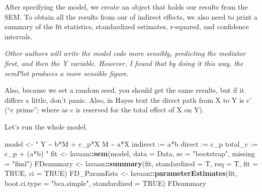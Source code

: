 \documentclass[
  11pt,
]{book}
\newenvironment{Shaded}{\begin{snugshade}}{\end{snugshade}}
\newcommand{\AttributeTok}[1]{\textcolor[rgb]{0.27,0.27,0.27}{#1}}
\newcommand{\ConstantTok}[1]{\textcolor[rgb]{0.37,0.37,0.37}{#1}}
\newcommand{\FunctionTok}[1]{\textcolor[rgb]{0.27,0.27,0.27}{\textbf{#1}}}
\newcommand{\NormalTok}[1]{#1}
\newcommand{\OtherTok}[1]{\textcolor[rgb]{0.37,0.37,0.37}{#1}}
\newcommand{\SpecialCharTok}[1]{\textcolor[rgb]{0.43,0.43,0.43}{\textbf{#1}}}
\newcommand{\StringTok}[1]{\textcolor[rgb]{0.5,0.5,0.5}{#1}}
\begin{document}
After specifying the model, we create an object that holds our results from the SEM. To obtain all the results from our of indirect effects, we also need to print a summary of the fit statistics, standardized estimates, r-squared, and confidence intervals.

\emph{Other authors will write the model code more sensibly, predicting the mediator first, and then the Y variable. However, I found that by doing it this way, the semPlot produces a more sensible figure.}

Also, because we set a random seed, you should get the same results, but if it differs a little, don't panic. Also, in Hayes text the direct path from X to Y is c' (``c prime''; where as c is reserved for the total effect of X on Y).

Let's run the whole model.

\begin{Shaded}
\begin{Highlighting}[]
\NormalTok{model }\OtherTok{\textless{}{-}} \StringTok{"}
\StringTok{          Y \textasciitilde{} b*M + c\_p*X }
\StringTok{          M \textasciitilde{} a*X}
\StringTok{          }
\StringTok{          indirect :=  a*b}
\StringTok{          direct  := c\_p}
\StringTok{          total\_c  := c\_p + (a*b)}
\StringTok{          "}
\NormalTok{fit }\OtherTok{\textless{}{-}}\NormalTok{ lavaan}\SpecialCharTok{::}\FunctionTok{sem}\NormalTok{(model, }\AttributeTok{data =}\NormalTok{ Data, }\AttributeTok{se =} \StringTok{"bootstrap"}\NormalTok{, }\AttributeTok{missing =} \StringTok{"fiml"}\NormalTok{)}
\NormalTok{FDsummary }\OtherTok{\textless{}{-}}\NormalTok{ lavaan}\SpecialCharTok{::}\FunctionTok{summary}\NormalTok{(fit, }\AttributeTok{standardized =}\NormalTok{ T, }\AttributeTok{rsq =}\NormalTok{ T, }\AttributeTok{fit =} \ConstantTok{TRUE}\NormalTok{,}
    \AttributeTok{ci =} \ConstantTok{TRUE}\NormalTok{)}
\NormalTok{FD\_ParamEsts }\OtherTok{\textless{}{-}}\NormalTok{ lavaan}\SpecialCharTok{::}\FunctionTok{parameterEstimates}\NormalTok{(fit, }\AttributeTok{boot.ci.type =} \StringTok{"bca.simple"}\NormalTok{,}
    \AttributeTok{standardized =} \ConstantTok{TRUE}\NormalTok{)}
\NormalTok{FDsummary}
\end{Highlighting}
\end{Shaded}
\end{document}
